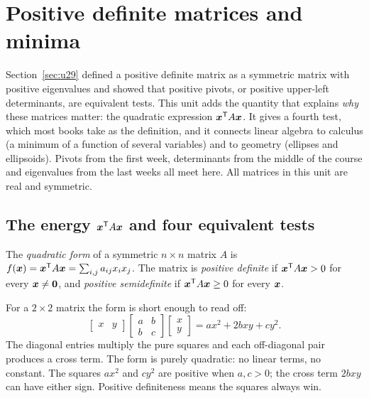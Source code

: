 \section{Positive definite matrices and minima}\label{sec:u31}

Section~\ref{sec:u29} defined a positive definite matrix as a symmetric matrix with positive
eigenvalues and showed that positive pivots, or positive upper-left determinants, are
equivalent tests. This unit adds the quantity that explains \emph{why} these matrices matter:
the quadratic expression $\boldsymbol{x}^{\mathsf{T}} A\boldsymbol{x}$. It gives a fourth test, which most books take as the
definition, and it connects linear algebra to calculus (a minimum of a function of several
variables) and to geometry (ellipses and ellipsoids). Pivots from the first week,
determinants from the middle of the course and eigenvalues from the last weeks all meet here.
All matrices in this unit are real and symmetric.

\subsection{The energy \texorpdfstring{$\boldsymbol{x}^{\mathsf{T}} A\boldsymbol{x}$}{xTAx} and four equivalent tests}

\begin{definition}\label{def:u31-form}
The \emph{quadratic form} of a symmetric $n\times n$ matrix $A$ is
$f(\boldsymbol{x})=\boldsymbol{x}^{\mathsf{T}} A\boldsymbol{x}=\sum_{i,j}a_{ij}x_ix_j$. The matrix is \emph{positive definite} if
$\boldsymbol{x}^{\mathsf{T}} A\boldsymbol{x}>0$ for every $\boldsymbol{x}\ne\boldsymbol{0}$, and \emph{positive semidefinite} if $\boldsymbol{x}^{\mathsf{T}} A\boldsymbol{x}\ge0$
for every $\boldsymbol{x}$.
\end{definition}

For a $2\times2$ matrix the form is short enough to read off:
\[
  \begin{bmatrix}x&y\end{bmatrix}\begin{bmatrix}a&b\\b&c\end{bmatrix}\begin{bmatrix}x\\y\end{bmatrix}
  =ax^2+2bxy+cy^2 .
\]
The diagonal entries multiply the pure squares and each off-diagonal pair produces a cross term.
The form is purely quadratic: no linear terms, no constant. The squares $ax^2$ and $cy^2$ are
positive when $a,c>0$; the cross term $2bxy$ can have either sign. Positive definiteness means
the squares always win.

